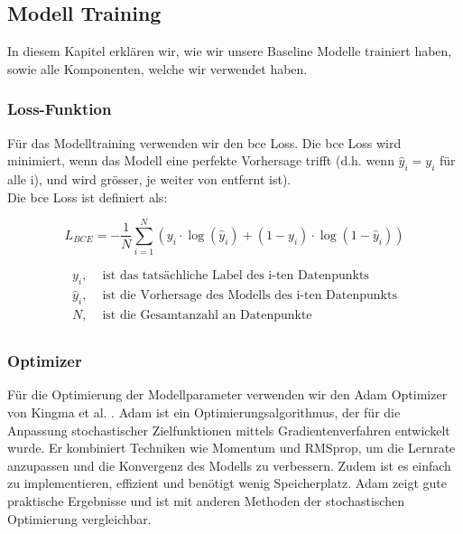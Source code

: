\subsection{Modell Training} \label{chap:modelltraining}

In diesem Kapitel erklären wir, wie wir unsere Baseline Modelle trainiert haben, sowie alle Komponenten, welche wir verwendet haben.

\subsubsection{Loss-Funktion} \label{chap:loss-function}
Für das Modelltraining verwenden wir den \acrlong{bce} Loss. Die \acrshort{bce} Loss wird minimiert, wenn das Modell eine perfekte Vorhersage trifft (d.h. wenn $\hat{y}_i = y_i$ für alle i), und wird grösser, je weiter von entfernt ist).  \\
Die \acrshort{bce} Loss ist definiert als:

\begin{equation}
    L_{BCE} = -\frac{1}{N} \sum_{i=1}^{N} (y_i \cdot \log(\hat{y}_i) + (1-y_i) \cdot \log(1-\hat{y}_i))
    \label{eq:TrainingBCE}
\end{equation}

\begin{align*}
y_i,        &\text{ ist das tatsächliche Label des i-ten Datenpunkts} \\
\hat{y}_i,  &\text{ ist die Vorhersage des Modells des i-ten Datenpunkts} \\
N,          &\text{ ist die Gesamtanzahl an Datenpunkte} \\
\end{align*} 

\subsubsection{Optimizer} \label{chap:optimizer}
Für die Optimierung der Modellparameter verwenden wir den Adam Optimizer von Kingma et al. \cite{kingma_adam_2017}. 
Adam ist ein Optimierungsalgorithmus, der für die Anpassung stochastischer Zielfunktionen mittels Gradientenverfahren entwickelt wurde. Er kombiniert Techniken wie Momentum und RMSprop, um die Lernrate anzupassen und die Konvergenz des Modells zu verbessern. Zudem ist es einfach zu implementieren, effizient und benötigt wenig Speicherplatz. Adam zeigt gute praktische Ergebnisse und ist mit anderen Methoden der stochastischen Optimierung vergleichbar. 

